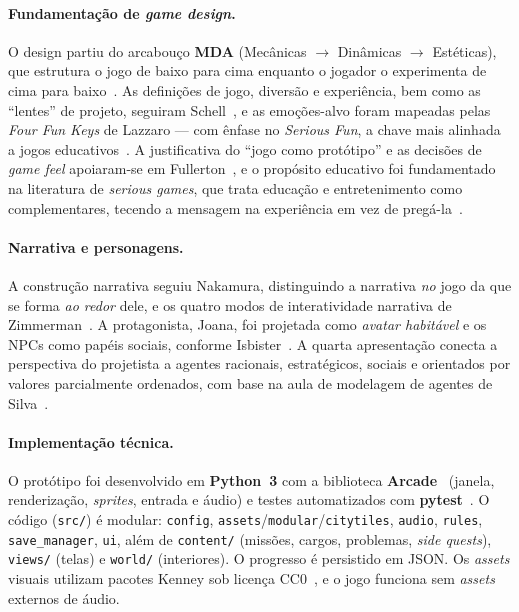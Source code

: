 \documentclass[10pt,twocolumn]{article}
\begin{document}
\paragraph{Fundamenta\c{c}\~ao de \emph{game design}.} O design partiu do arcabou\c{c}o
\textbf{MDA} (Mec\^anicas $\rightarrow$ Din\^amicas $\rightarrow$ Est\'eticas), que
estrutura o jogo de baixo para cima enquanto o jogador o experimenta de cima para
baixo~\cite{mda}. As defini\c{c}\~oes de jogo, divers\~ao e experi\^encia, bem como as
``lentes'' de projeto, seguiram Schell~\cite{schell}, e as emo\c{c}\~oes-alvo foram
mapeadas pelas \emph{Four Fun Keys} de Lazzaro --- com \^enfase no \emph{Serious Fun},
a chave mais alinhada a jogos educativos~\cite{lazzaro}. A justificativa do
``jogo como prot\'otipo'' e as decis\~oes de \emph{game feel} apoiaram-se em
Fullerton~\cite{fullerton}, e o prop\'osito educativo foi fundamentado na literatura
de \emph{serious games}, que trata educa\c{c}\~ao e entretenimento como complementares,
tecendo a mensagem na experi\^encia em vez de preg\'a-la~\cite{seriousgames}.

\paragraph{Narrativa e personagens.} A constru\c{c}\~ao narrativa seguiu Nakamura,
distinguindo a narrativa \emph{no} jogo da que se forma \emph{ao redor} dele, e os
quatro modos de interatividade narrativa de Zimmerman~\cite{nakamura,zimmerman}.
A protagonista, Joana, foi projetada como \emph{avatar habit\'avel} e os NPCs como
pap\'eis sociais, conforme Isbister~\cite{isbister}. A quarta apresenta\c{c}\~ao conecta
a perspectiva do projetista a agentes racionais, estrat\'egicos, sociais e orientados
por valores parcialmente ordenados, com base na aula de modelagem de agentes de
Silva~\cite{silva}.

\paragraph{Implementa\c{c}\~ao t\'ecnica.} O prot\'otipo foi desenvolvido em
\textbf{Python~3} com a biblioteca \textbf{Arcade}~\cite{arcade} (janela,
renderiza\c{c}\~ao, \emph{sprites}, entrada e \'audio) e testes automatizados com
\textbf{pytest}~\cite{pytest}. O c\'odigo (\texttt{src/}) \'e modular: \texttt{config},
\texttt{assets}/\texttt{modular}/\texttt{citytiles}, \texttt{audio}, \texttt{rules},
\texttt{save\_manager}, \texttt{ui}, al\'em de \texttt{content/} (miss\~oes, cargos,
problemas, \emph{side quests}), \texttt{views/} (telas) e \texttt{world/} (interiores).
O progresso \'e persistido em JSON. Os \emph{assets} visuais utilizam pacotes
Kenney sob licen\c{c}a CC0~\cite{kenney,cc0}, e o jogo funciona sem \emph{assets}
externos de \'audio.
\end{document}
